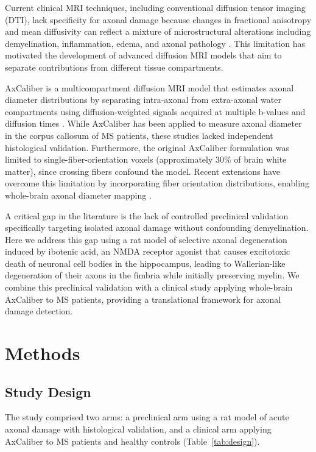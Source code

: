 \documentclass[11pt]{article}
\begin{document}
Current clinical MRI techniques, including conventional diffusion tensor imaging (DTI), lack specificity for axonal damage because changes in fractional anisotropy and mean diffusivity can reflect a mixture of microstructural alterations including demyelination, inflammation, edema, and axonal pathology \citep{alexander2007diffusion}. This limitation has motivated the development of advanced diffusion MRI models that aim to separate contributions from different tissue compartments.

AxCaliber is a multicompartment diffusion MRI model that estimates axonal diameter distributions by separating intra-axonal from extra-axonal water compartments using diffusion-weighted signals acquired at multiple b-values and diffusion times \citep{assaf2008axcaliber}. While AxCaliber has been applied to measure axonal diameter in the corpus callosum of MS patients, these studies lacked independent histological validation. Furthermore, the original AxCaliber formulation was limited to single-fiber-orientation voxels (approximately 30\% of brain white matter), since crossing fibers confound the model. Recent extensions have overcome this limitation by incorporating fiber orientation distributions, enabling whole-brain axonal diameter mapping \citep{barazany2009vivo}.

A critical gap in the literature is the lack of controlled preclinical validation specifically targeting isolated axonal damage without confounding demyelination. Here we address this gap using a rat model of selective axonal degeneration induced by ibotenic acid, an NMDA receptor agonist that causes excitotoxic death of neuronal cell bodies in the hippocampus, leading to Wallerian-like degeneration of their axons in the fimbria while initially preserving myelin. We combine this preclinical validation with a clinical study applying whole-brain AxCaliber to MS patients, providing a translational framework for axonal damage detection.

\section{Methods}

\subsection{Study Design}

The study comprised two arms: a preclinical arm using a rat model of acute axonal damage with histological validation, and a clinical arm applying AxCaliber to MS patients and healthy controls (Table~\ref{tab:design}).
\end{document}
